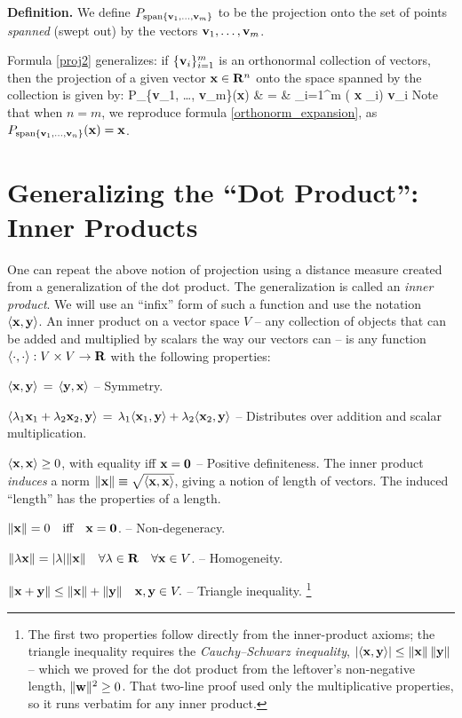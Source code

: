 \documentclass[12pt]{article}
\begin{document}
{\bf Definition.} We define $P_{\mathrm{span}\{{\bf v}_1, \ldots, {\bf v}_m\}}$ to be
the projection onto the set of points {\em spanned\/} (swept out) by the
vectors ${\bf v}_1, \ldots, {\bf v}_m$.

Formula \eqref{proj2} generalizes: if
$\{{\bf v}_i\}_{i=1}^m$ is an orthonormal collection of vectors, then the
projection of a given vector ${\bf x} \in {\bf R}^n$ onto the
space spanned by the collection is given by:
\be
  P_{\{{\bf v}_1, \ldots, {\bf v}_m\}}({\bf x}) & = & \sum_{i=1}^m ( {\bf x} _i) {\bf v}_i
\ee
Note that when $n = m$, we reproduce formula \eqref{orthonorm_expansion},
as $P_{\mathrm{span}\{{\bf v}_1, \ldots, {\bf v}_n\}}({\bf x}) = {\bf x}$.

\section{Generalizing the ``Dot Product'': Inner Products}

One can repeat the above notion of projection using a distance measure created from a generalization of the dot product.
The generalization is called an {\em inner product}. We will use an ``infix'' form of such a function and use the notation
$\langle{\bf x}, {\bf y}\rangle$. An inner product on a vector space $V$ -- any collection of objects that can be
added and multiplied by scalars the way our vectors can -- is any function
$\langle \cdot, \cdot \rangle : V \times V \rightarrow {\bf R}$ with the following properties:
\bi
  \item  $ \langle {\bf x}, {\bf y}\rangle \, = \, \langle{\bf y}, {\bf x}\rangle$ -- Symmetry.
  \item  $ \langle \lambda_1 {\bf x}_1 + \lambda_2 {\bf x}_2, {\bf y}\rangle \, = \, 
      \lambda_1 \langle{\bf x}_1, {\bf y}\rangle + \lambda_2 \langle{\bf x}_2, {\bf y}\rangle $ -- Distributes over addition and scalar multiplication.
  \item $\langle {\bf x}, {\bf x}\rangle \ge 0$, with equality iff ${\bf x} = {\bf 0}$ -- Positive definiteness.
\ei
The inner product {\em induces\/} a norm $\|{\bf x}\| \equiv \sqrt{\langle{\bf x}, {\bf x}\rangle}$,
giving a notion of length of vectors. The induced ``length'' has the properties of a length.
\bi
  \item $\|{\bf x}\| = 0 \quad \text{iff} \quad {\bf x} = {\bf 0}$. -- Non-degeneracy.
  \item $\|\lambda {\bf x}\| = |\lambda| \|{\bf x}\|\quad \forall \lambda \in {\bf R} \quad \forall {\bf x} \in V$. -- Homogeneity.
  \item $\|{\bf x} + {\bf y} \| \le \|{\bf x}\| + \|{\bf y}\| \quad {\bf x}, {\bf y} \in V.$ -- Triangle inequality.%
\footnote{The first two properties follow directly from the inner-product
axioms; the triangle inequality requires the {\em Cauchy--Schwarz
inequality\/}, $|\langle{\bf x}, {\bf y}\rangle| \le \|{\bf x}\|\,\|{\bf y}\|$
-- which we proved for the dot product from the leftover's non-negative
length, $\|{\bf w}\|^2 \ge 0$. That two-line proof used only the
multiplicative properties, so it runs verbatim for any inner product.}
\ei
\end{document}
